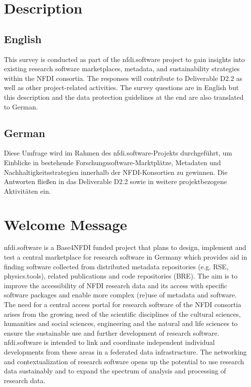 \documentclass[headsepline,titlepage,twoside,12pt,toc=flat,headings=normal]{scrreprt}
\begin{document}
\section{Description}
\subsection{English}
This survey is conducted as part of the nfdi.software project to gain insights into existing research software marketplaces, metadata, and sustainability strategies within the NFDI consortia.
The responses will contribute to Deliverable D2.2 as well as other project-related activities.
The survey questions are in English but this description and the data protection guidelines at the end are also translated to German.

\subsection{German}
Diese Umfrage wird im Rahmen des nfdi.software-Projekts durchgeführt, um Einblicke in bestehende Forschungssoftware-Marktplätze, Metadaten und Nachhaltigkeitsstrategien innerhalb der NFDI-Konsortien zu gewinnen.
Die Antworten fließen in das Deliverable D2.2 sowie in weitere projektbezogene Aktivitäten ein.

\section{Welcome Message}
nfdi.software is a Base4NFDI funded project that plans to design, implement and test a central marketplace for research software in Germany which provides aid in finding software collected from distributed metadata repositories (e.g. RSE, physics.tools), related publications and code repositories (BRE).
The aim is to improve the accessibility of NFDI research data and its access with specific software packages and enable more complex (re)use of metadata and software.
The need for a central access portal for research software of the NFDI consortia arises from the growing need of the scientific disciplines of the cultural sciences, humanities and social sciences, engineering and the natural and life sciences to ensure the sustainable use and further development of research software.
nfdi.software is intended to link and coordinate independent individual developments from these areas in a federated data infrastructure.
The networking and contextualization of research software opens up the potential to use research data sustainably and to expand the spectrum of analysis and processing of research data.
\end{document}
